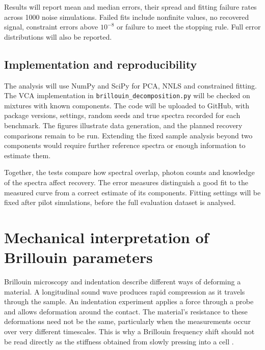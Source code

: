 \documentclass[11pt]{article}
\begin{document}
Results will report mean and median errors, their spread and fitting failure rates across 1000 noise simulations. Failed fits include nonfinite values, no recovered signal, constraint errors above $10^{-8}$ or failure to meet the stopping rule. Full error distributions will also be reported.

\subsection{Implementation and reproducibility}
\label{sec:implementation}

The analysis will use NumPy and SciPy for PCA, NNLS and constrained fitting. The VCA implementation in \texttt{brillouin\_decomposition.py} will be checked on mixtures with known components. The code will be uploaded to GitHub, with package versions, settings, random seeds and true spectra recorded for each benchmark. The figures illustrate data generation, and the planned recovery comparisons remain to be run. Extending the fixed sample analysis beyond two components would require further reference spectra or enough information to estimate them.

Together, the tests compare how spectral overlap, photon counts and knowledge of the spectra affect recovery. The error measures distinguish a good fit to the measured curve from a correct estimate of its components. Fitting settings will be fixed after pilot simulations, before the full evaluation dataset is analysed.

\clearpage
{}
{}



\clearpage
\appendix
{}
\section{Mechanical interpretation of Brillouin parameters}
\label{app:mechanical_interpretation}

Brillouin microscopy and indentation describe different ways of deforming a material. A longitudinal sound wave produces rapid compression as it travels through the sample. An indentation experiment applies a force through a probe and allows deformation around the contact. The material's resistance to these deformations need not be the same, particularly when the measurements occur over very different timescales. This is why a Brillouin frequency shift should not be read directly as the stiffness obtained from slowly pressing into a cell \citep{bouvet2025}.
\end{document}

